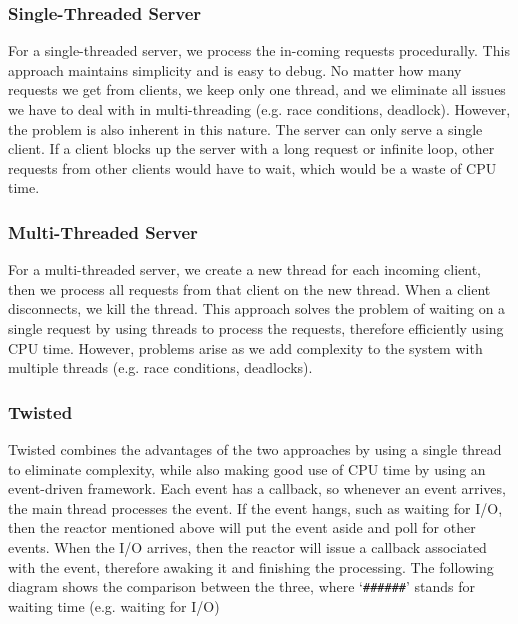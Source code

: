 \documentclass[letterpaper,twocolumn,10pt]{article}
\begin{document}
\subsubsection{Single-Threaded Server}

For a single-threaded server, we process the in-coming requests procedurally. This approach maintains simplicity and is easy to debug. No matter how many requests we get from clients, we keep only one thread, and we eliminate all issues we have to deal with in multi-threading (e.g. race conditions, deadlock). However, the problem is also inherent in this nature. The server can only serve a single client. If a client blocks up the server with a long request or infinite loop, other requests from other clients would have to wait, which would be a waste of CPU time.

\subsubsection{Multi-Threaded Server}

For a multi-threaded server, we create a new thread for each incoming client, then we process all requests from that client on the new thread. When a client disconnects, we kill the thread. This approach solves the problem of waiting on a single request by using threads to process the requests, therefore efficiently using CPU time. However, problems arise as we add complexity to the system with multiple threads (e.g. race conditions, deadlocks).

\subsubsection{Twisted}

Twisted combines the advantages of the two approaches by using a single thread to eliminate complexity, while also making good use of CPU time by using an event-driven framework. Each event has a callback, so whenever an event arrives, the main thread processes the event. If the event hangs, such as waiting for I/O, then the reactor mentioned above will put the event aside and poll for other events. When the I/O arrives, then the reactor will issue a callback associated with the event, therefore awaking it and finishing the processing. The following diagram shows the comparison between the three, where `{\tt \#\#\#\#\#\#}' stands for waiting time (e.g. waiting for I/O)
\end{document}
